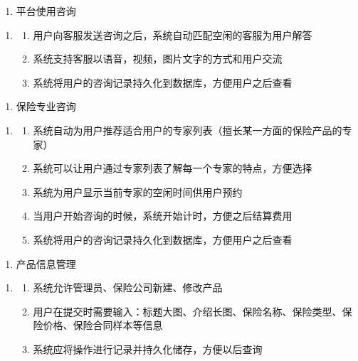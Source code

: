 \documentclass[a4paper]{ctexart}
\begin{document}
\begin{enumerate}[label=UR10.]
  \item 平台使用咨询
\end{enumerate}
\begin{enumerate}[label=SR15.]
  \item 
  \begin{enumerate}[label=\arabic*).]
    \item 用户向客服发送咨询之后，系统自动匹配空闲的客服为用户解答
    \item 系统支持客服以语音，视频，图片文字的方式和用户交流
    \item 系统将用户的咨询记录持久化到数据库，方便用户之后查看
  \end{enumerate}
\end{enumerate}

\begin{enumerate}[label=UR11.]
  \item 保险专业咨询
\end{enumerate}
\begin{enumerate}[label=SR16.]
  \item 
  \begin{enumerate}[label=\arabic*).]
    \item 系统自动为用户推荐适合用户的专家列表（擅长某一方面的保险产品的专家）
    \item 系统可以让用户通过专家列表了解每一个专家的特点，方便选择
    \item 系统为用户显示当前专家的空闲时间供用户预约
    \item 当用户开始咨询的时候，系统开始计时，方便之后结算费用
    \item 系统将用户的咨询记录持久化到数据库，方便用户之后查看
  \end{enumerate}
\end{enumerate}

\begin{enumerate}[label=UR12.]
  \item 产品信息管理
\end{enumerate}
\begin{enumerate}[label=SR17.]
  \item 
  \begin{enumerate}[label=\arabic*).]
    \item 系统允许管理员、保险公司新建、修改产品
    \item 用户在提交时需要输入：标题大图、介绍长图、保险名称、保险类型、保险价格、保险合同样本等信息
    \item 系统应将操作进行记录并持久化储存，方便以后查询
  \end{enumerate}
\end{enumerate}
\end{document}
